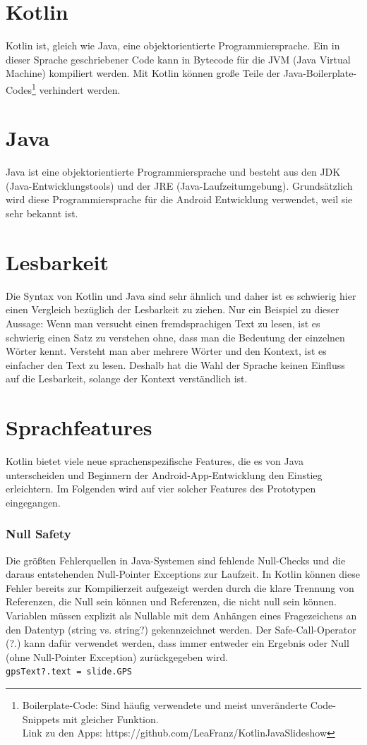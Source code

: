 \documentclass{sigchi-ext}
\begin{document}
\section{Kotlin}
Kotlin ist, gleich wie Java, eine objektorientierte Programmiersprache. Ein in dieser Sprache geschriebener Code kann 
in Bytecode für die JVM (Java Virtual Machine) kompiliert werden. Mit Kotlin können große Teile der
Java-Boilerplate-Codes\footnote{Boilerplate-Code: Sind häufig verwendete und meist unveränderte Code-Snippets mit
gleicher Funktion. \\Link zu den Apps: https://github.com/LeaFranz/KotlinJavaSlideshow} verhindert werden.\cite{boilerplate}

\section{Java}
Java ist eine objektorientierte Programmiersprache und besteht aus den JDK (Java-Entwicklungstools) und der JRE
 (Java-Laufzeitumgebung). Grundsätzlich wird diese Programmiersprache für die Android Entwicklung 
 verwendet, weil sie sehr bekannt ist. \cite{banerjee2018comparative}

\section{Lesbarkeit}
Die Syntax von Kotlin und Java sind sehr ähnlich und daher ist es schwierig hier einen Vergleich bezüglich der Lesbarkeit zu ziehen.
Nur ein Beispiel zu dieser Aussage: Wenn man versucht einen fremdsprachigen
Text zu lesen, ist es schwierig einen Satz zu verstehen ohne, dass man die Bedeutung der
einzelnen Wörter kennt. Versteht man aber mehrere Wörter und den Kontext, ist es einfacher den
Text zu lesen. Deshalb hat die Wahl der Sprache keinen Einfluss auf die Lesbarkeit, solange
der Kontext verständlich ist.

\section{Sprachfeatures}
Kotlin bietet viele neue sprachenspezifische Features, die es von Java unterscheiden und Beginnern der Android-App-Entwicklung den Einstieg erleichtern. Im Folgenden wird auf vier solcher Features des Prototypen eingegangen.

\subsubsection{Null Safety}
Die größten Fehlerquellen in Java-Systemen sind fehlende Null-Checks und die daraus entstehenden Null-Pointer Exceptions zur Laufzeit. In Kotlin können diese Fehler bereits zur Kompilierzeit aufgezeigt werden durch die klare Trennung von Referenzen, die Null sein können und Referenzen, die nicht null sein können. Variablen müssen explizit als Nullable mit dem Anhängen eines Fragezeichens an den Datentyp (string vs. string?) gekennzeichnet werden. Der Safe-Call-Operator (?.) kann dafür verwendet werden, dass immer entweder ein Ergebnis oder Null (ohne Null-Pointer Exception) zurückgegeben wird. \cite{moskala2017android} \\ \vskip 0.1in \texttt{gpsText?.text = slide.GPS} \\ 
\end{document}

